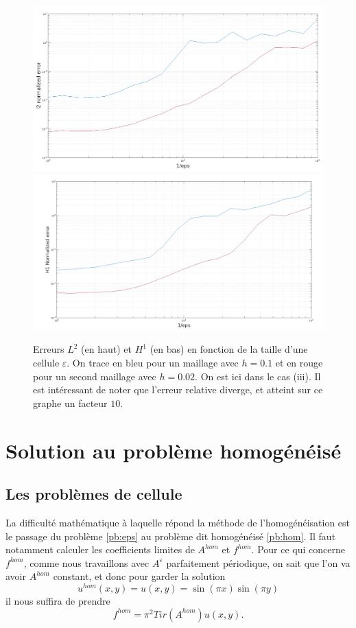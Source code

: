 \documentclass[11pt]{article}
\newcommand{\Ah}{A^{hom}}
\newcommand{\uh}{u^{hom}}
\newcommand{\fh}{f^{hom}}
\begin{document}
\begin{figure}
  \centering
  \includegraphics[height=.25\textheight]{SolutionExacte/err_L2_eps} 
  \includegraphics[height=.25\textheight]{SolutionExacte/err_H1_eps}   
  \caption{Erreurs $L^2$ (en haut) et $H^1$ (en bas) en fonction de la taille d'une cellule $\varepsilon$. On trace en bleu pour un maillage avec
    $h=0.1$ et en rouge pour un second maillage avec $h=0.02$. On est ici dans le cas (iii). Il est intéressant de noter que l'erreur relative
    diverge, et atteint sur ce graphe un facteur $10$.}
  \label{fig:osc_eps}
\end{figure}
\section{Solution au problème homogénéisé}

\subsection{Les problèmes de cellule}

La difficulté mathématique à laquelle répond la méthode de l'homogénéisation est le passage du problème \ref{pb:eps} au problème dit homogénéisé
\ref{pb:hom}. Il faut notamment calculer les coefficients limites de $\Ah$ et $\fh$. Pour ce qui concerne $\fh$, comme nous travaillons avec
$A^\varepsilon$ parfaitement périodique, on sait que l'on va avoir $\Ah$ constant, et donc pour garder la solution
\[
  \uh(x, y) = u(x, y) = \sin(\pi x)\sin(\pi y)
\]
il nous suffira de prendre
\[
  \fh = \pi^2 Tir(\Ah) u(x, y).
\]
\end{document}
